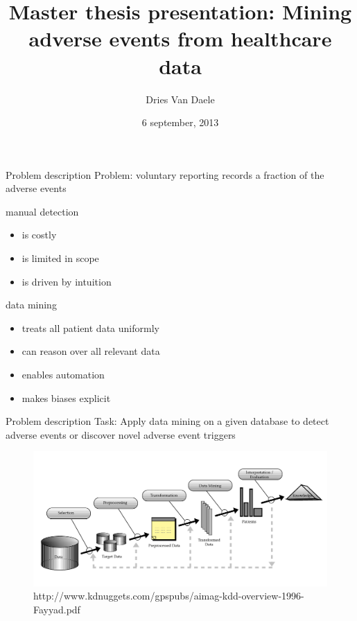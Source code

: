 \documentclass{beamer}
\title[Master thesis presentation: Mining adverse events from healthcare data]
{Master thesis presentation: Mining adverse events from healthcare data}
\author[Dries Van Daele]{Dries Van Daele}
\institute{KU Leuven, DTAI}
\date{6 september, 2013}
\begin{document}
\begin{frame}{}
  \titlepage
\end{frame}

\begin{frame}{Problem description}
Problem: voluntary reporting records a fraction of the adverse events\vspace{3 mm}


manual detection
\begin{itemize}
\item is costly
\item is limited in scope
\item is driven by intuition
\end{itemize}
data mining
\begin{itemize}
\item treats all patient data uniformly
\item can reason over all relevant data
\item enables automation
\item makes biases explicit
\end{itemize}
\end{frame}


\begin{frame}{Problem description}
Task: Apply data mining on a given database to detect adverse events or discover novel adverse event triggers
\begin{figure}
\includegraphics[width=\textwidth,height=.88\textheight,keepaspectratio]{kdd}
{\footnotesize \caption{http://www.kdnuggets.com/gpspubs/aimag-kdd-overview-1996-Fayyad.pdf}}
\end{figure}

\end{frame}


\end{document}
